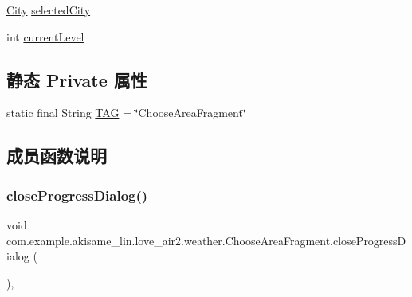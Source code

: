 \begin{DoxyCompactItemize}
$$\item 
\mbox{\hyperlink{classcom_1_1example_1_1akisame__lin_1_1love__air2_1_1weather_1_1db_1_1_city}{City}} \mbox{\hyperlink{classcom_1_1example_1_1akisame__lin_1_1love__air2_1_1weather_1_1_choose_area_fragment_a70363554c97ee93c0f4af5f47618ea97}{selected\+City}}
\item 
int \mbox{\hyperlink{classcom_1_1example_1_1akisame__lin_1_1love__air2_1_1weather_1_1_choose_area_fragment_a2017e039c9d563768c08359e2d44e2f1}{current\+Level}}
\end{DoxyCompactItemize}
\subsection*{静态 Private 属性}
\begin{DoxyCompactItemize}
\item 
static final String \mbox{\hyperlink{classcom_1_1example_1_1akisame__lin_1_1love__air2_1_1weather_1_1_choose_area_fragment_ac3dcaca184710d49abe06b50fb7f1b4f}{T\+AG}} = \char`\"{}Choose\+Area\+Fragment\char`\"{}
\end{DoxyCompactItemize}


\subsection{成员函数说明}
\mbox{\label{classcom_1_1example_1_1akisame__lin_1_1love__air2_1_1weather_1_1_choose_area_fragment_a2d8a3645cd87247717fb632442355641}} 
\subsubsection{\texorpdfstring{closeProgressDialog()}{closeProgressDialog()}}
{\footnotesize\ttfamily void com.\+example.\+akisame\+\_\+lin.\+love\+\_\+air2.\+weather.\+Choose\+Area\+Fragment.\+close\+Progress\+Dialog (\begin{DoxyParamCaption}{ }\end{DoxyParamCaption})\hspace{0.3cm}{\ttfamily [inline]}, {\ttfamily [private]}}

